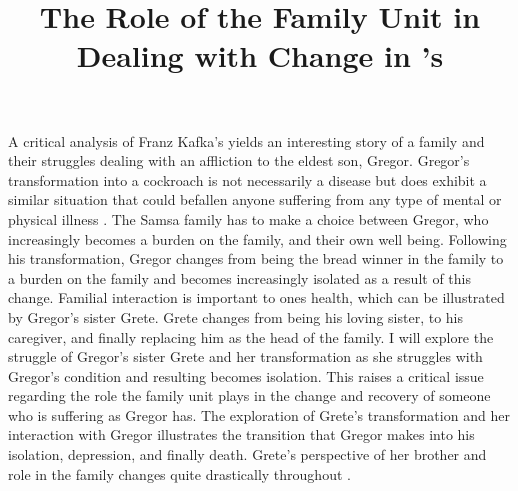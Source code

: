 \documentclass{article}
\title{The Role of the Family Unit in Dealing with Change in
\citeauthor{kafka2007meta}'s \citetitle{kafka2007meta}}
\begin{document}
\makeheader

A critical analysis of Franz Kafka's  yields an
interesting story of a family and their struggles dealing with an affliction
to the eldest son, Gregor. Gregor's transformation into a cockroach is not
necessarily a disease but does exhibit a similar situation that could
befallen anyone suffering from any type of mental or physical illness
\cite[267]{rowe2002}. The Samsa family has to make a choice between Gregor,
who increasingly becomes a burden on the family, and their own well being.
Following his transformation, Gregor changes from being the bread winner in
the family to a burden on the family and becomes increasingly isolated as a
result of this change. Familial interaction is important to ones health,
which can be illustrated by Gregor's sister Grete. Grete changes from being
his loving sister, to his caregiver, and finally replacing him as the head
of the family. I will explore the struggle of Gregor's sister Grete and her
transformation as she struggles with Gregor's condition and resulting
becomes isolation. This raises a critical issue regarding the role the
family unit plays in the change and recovery of someone who is suffering as
Gregor has. The exploration of Grete's transformation and her interaction
with Gregor illustrates the transition that Gregor makes into his isolation,
depression, and finally death. Grete's perspective of her brother and role
in the family changes quite drastically throughout
.

\end{document}
